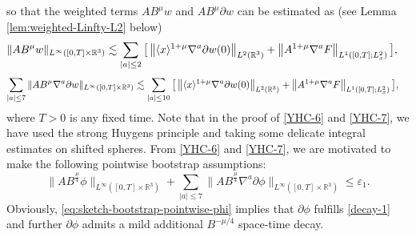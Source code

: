 \documentclass[11pt,twoside]{article}
\def\R{\mathop{\mathbb R\kern 0pt}\nolimits}
\def\p{\partial}
\theoremstyle{plain}
\theoremstyle{definition}
\theoremstyle{assumption}
\numberwithin{equation}{section}
\begin{document}
so that the weighted terms $AB^\mu w$ and $AB^\mu\partial w$ can be estimated as (see Lemma \ref{lem:weighted-Linfty-L2} below)
\begin{equation}\label{YHC-6}
\begin{aligned}
\|A B^\mu w\|_{L^\infty([0,T]\times\mathbb R^3)}
&\lesssim\sum_{|a|\le 2}\big[\left\|\langle x\rangle^{1+\mu}
\nabla^a \p w(0)
\right\|_{L^2(\R^3)}+\left\|
A^{1+\mu}\nabla^a F\right\|_{L^1([0,T];L^2_x)}\big],
\end{aligned}
\end{equation}
\begin{equation}\label{YHC-7}
\begin{aligned}
\sum_{|a|\le 7}\|A B^\mu \nabla^a\partial w\|_{L^\infty([0,T]\times\mathbb R^3)}
&\lesssim\sum_{|a|\le 10}
\big[\left\|\langle x\rangle^{1+\mu}\nabla^a \p w(0)
\right\|_{L^2(\R^3)}+\left\|A^{1+\mu}\nabla^a F\right\|_{L^1([0,T];L^2_x)}\big],
\end{aligned}
\end{equation}
where $T>0$ is any fixed time. Note that in the proof of \eqref{YHC-6} and \eqref{YHC-7}, we have used
the strong Huygens principle and taking some delicate integral estimates on shifted spheres.
From \eqref{YHC-6} and \eqref{YHC-7}, we are motivated to make the following pointwise bootstrap assumptions:
	\begin{equation}\label{eq:sketch-bootstrap-pointwise-phi}
		\big\|AB^{\frac{\mu}{4}}\phi\big\|_{L^\infty([0,T]\times\mathbb R^3)}
		+\sum_{|a|\le 7}\big\|
		AB^{\frac{\mu}{4}}\nabla^a\partial\phi
		\big\|_{L^\infty([0,T]\times\mathbb R^3)}
		\le
		\varepsilon_1.
	\end{equation}
	Obviously, \eqref{eq:sketch-bootstrap-pointwise-phi} implies that \(\partial\phi\) fulfills \eqref{decay-1}
and further \(\partial\phi\) admits a mild additional
	\(B^{-\mu/4}\) space-time decay.
\end{document}
